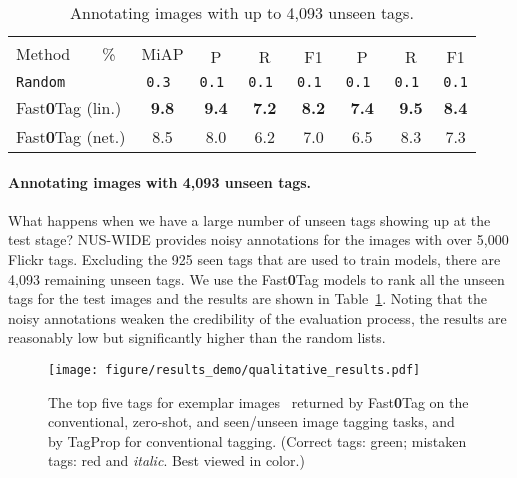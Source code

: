 \documentclass[10pt,twocolumn,letterpaper]{article}
\newcommand{\ours}{{Fast\textbf{0}Tag}}
\begin{document}
\begin{table}
	\centering
	\caption{Annotating images with up to 4,093 unseen tags. \vspace{-10pt}}
	\label{t4K}
	\scriptsize
	\begin{tabular}{|l|c|c|c|c|c|c|c|}
		\hline
		\multirow{2}{*}{ Method~~~~\%} & \multirow{2}{*}{ MiAP} & \multicolumn{3}{c|}{} & \multicolumn{3}{|c|}{}\\
		& \multirow{1}{*}{} & P & R  & { F1} & P & R & { F1} \\
		
			\hline\hline
			{\tt Random} & \tt{0.3}  & \tt{0.1} & \tt{0.1} & \tt{0.1} & \tt{0.1} & \tt{0.1} & \tt{0.1}\\
			\hline
{ {\ours} (lin.)} & {\bf 9.8}  & {\bf 9.4} & {\bf 7.2} & {\bf 8.2} & {\bf 7.4} & {\bf 9.5} & {\bf 8.4}\\
			\hline
			{ {\ours} (net.)} & 8.5  & 8.0 & 6.2 & 7.0  & 6.5 & 8.3 & 7.3\\
		\hline
	\end{tabular}
	\vspace{-10pt}
\end{table}

\paragraph{Annotating images with 4,093 unseen tags.}
What happens when we have a large number of  unseen tags showing up at the test stage? NUS-WIDE provides noisy annotations for the images with over 5,000 Flickr tags. Excluding the 925 seen tags that are used to train models, there are  4,093 remaining unseen tags. We use the {\ours} models to rank all the unseen tags for the test images and the results are shown in Table~\ref{t4K}. Noting that the noisy annotations weaken the credibility of the evaluation process, the results are reasonably low  but significantly higher than the random lists.
\vspace{-21pt}




\begin{figure}[t]
\centering
\texttt{[image: figure/results\_demo/qualitative\_results.pdf]}
\vspace{-14pt}
   \caption{The top five tags for  exemplar images~\cite{chua_nus-wide:_2009} returned by  {\ours} on the conventional, zero-shot, and seen/unseen image tagging tasks, and by TagProp for conventional tagging. (Correct tags: {\color{green} green}; mistaken tags: {\color{red} red}  and \textit{italic}. Best viewed in color.)
}
\vspace{-14pt}
\label{fQual}
\end{figure}
\end{document}
